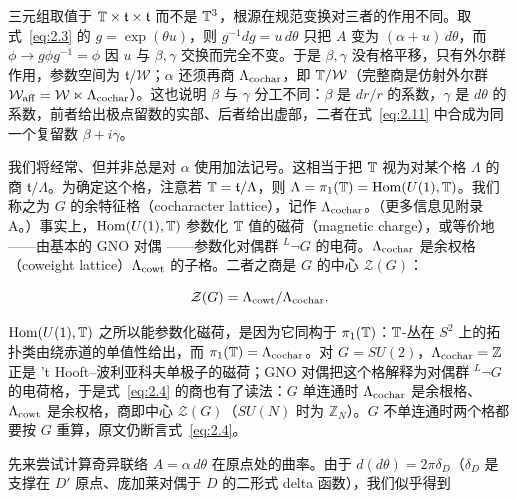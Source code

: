 \begin{yizhu}[易错点]
三元组取值于 ${\mathbb{T}}\times\mathfrak t\times\mathfrak t$ 而不是 ${\mathbb{T}}^3$，根源在规范变换对三者的作用不同。取式~\eqref{eq:2.3} 的 $g=\exp(\theta u)$，则 $g^{-1}dg=u\,d\theta$ 只把 $A$ 变为 $(\alpha+u)\,d\theta$，而 $\phi\to g\phi g^{-1}=\phi$ 因 $u$ 与 $\beta,\gamma$ 交换而完全不变。于是 $\beta,\gamma$ 没有格平移，只有外尔群作用，参数空间为 $\mathfrak t/{\mathcal W}$；$\alpha$ 还须再商 $\Lambda_{\rm cochar}$，即 ${\mathbb{T}}/{\mathcal W}$（完整商是仿射外尔群 ${\mathcal W}_{\rm aff}={\mathcal W}\ltimes\Lambda_{\rm cochar}$）。这也说明 $\beta$ 与 $\gamma$ 分工不同：$\beta$ 是 $dr/r$ 的系数，$\gamma$ 是 $d\theta$ 的系数，前者给出极点留数的实部、后者给出虚部，二者在式~\eqref{eq:2.11} 中合成为同一个复留数 $\beta+i\gamma$。
\end{yizhu}

我们将经常、但并非总是对 $\alpha$ 使用加法记号。这相当于把 ${\mathbb{T}}$ 视为对某个格 $\Lambda$ 的商 ${\mathfrak t}/\Lambda$。为确定这个格，注意若 ${\mathbb{T}}={\mathfrak t}/\Lambda$，则 $\Lambda=\pi_1({\mathbb{T}})={\rm Hom}(U(1),{\mathbb{T}})$。我们称之为 $G$ 的余特征格（cocharacter lattice），记作 $\Lambda_{\rm cochar}$。（更多信息见附录 A。）事实上，${\rm Hom}(U(1),{\mathbb{T}})$ 参数化 ${\mathbb{T}}$ 值的磁荷（magnetic charge），或等价地——由基本的 GNO 对偶 \cite{ref39}——参数化对偶群 $^L\neg G$ 的电荷。$\Lambda_{\rm cochar}$ 是余权格（coweight lattice）$\Lambda_{\rm cowt}$ 的子格。二者之商是 $G$ 的中心 ${\mathcal Z}(G)$：

\setcounter{equation}{3}
\begin{equation}\label{eq:2.4}
  {\mathcal Z}(G)=\Lambda_{\rm cowt}/\Lambda_{\rm cochar}.
\end{equation}

\begin{yizhu}[含糊点拨]
${\rm Hom}(U(1),{\mathbb{T}})$ 之所以能参数化磁荷，是因为它同构于 $\pi_1({\mathbb{T}})$：${\mathbb{T}}$-丛在 $S^2$ 上的拓扑类由绕赤道的单值性给出，而 $\pi_1({\mathbb{T}})=\Lambda_{\rm cochar}$。对 $G=SU(2)$，$\Lambda_{\rm cochar}=\mathbb{Z}$ 正是 't Hooft–波利亚科夫单极子的磁荷；GNO 对偶把这个格解释为对偶群 $^L\neg G$ 的电荷格，于是式~\eqref{eq:2.4} 的商也有了读法：$G$ 单连通时 $\Lambda_{\rm cochar}$ 是余根格、$\Lambda_{\rm cowt}$ 是余权格，商即中心 ${\mathcal Z}(G)$（$SU(N)$ 时为 $\mathbb{Z}_N$）。$G$ 不单连通时两个格都要按 $G$ 重算，原文仍断言式~\eqref{eq:2.4}。
\end{yizhu}


\bigskip{}


先来尝试计算奇异联络 $A=\alpha\,d\theta$ 在原点处的曲率。由于 $d(d\theta)=2\pi
\delta_D$（$\delta_D$ 是支撑在 $D'$ 原点、庞加莱对偶于 $D$ 的二形式 delta 函数），我们似乎得到

